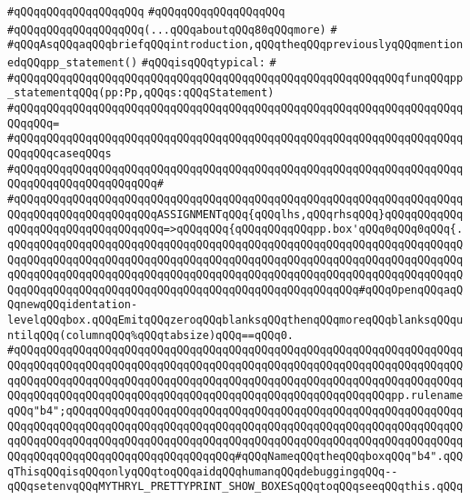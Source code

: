 \label{src/lib/prettyprint/big/src/standard-prettyprinter.api}
\verb|#qQQqqQQqqQQqqQQqqQQq|\newline
\verb|#qQQqqQQqqQQqqQQqqQQq|\newline
\verb|#qQQqqQQqqQQqqQQqqQQq(...qQQqaboutqQQq80qQQqmore)|\newline
\verb|#|\newline
\verb|#qQQqAsqQQqaqQQqbriefqQQqintroduction,qQQqtheqQQqpreviouslyqQQqmentionedqQQqpp_statement()|\newline
\verb|#qQQqisqQQqtypical:|\newline
\verb|#|\newline
\verb|#qQQqqQQqqQQqqQQqqQQqqQQqqQQqqQQqqQQqqQQqqQQqqQQqqQQqqQQqqQQqfunqQQqpp_statementqQQq(pp:Pp,qQQqs:qQQqStatement)|\newline
\verb|#qQQqqQQqqQQqqQQqqQQqqQQqqQQqqQQqqQQqqQQqqQQqqQQqqQQqqQQqqQQqqQQqqQQqqQQqqQQq=|\newline
\verb|#qQQqqQQqqQQqqQQqqQQqqQQqqQQqqQQqqQQqqQQqqQQqqQQqqQQqqQQqqQQqqQQqqQQqqQQqqQQqcaseqQQqs|\newline
\verb|#qQQqqQQqqQQqqQQqqQQqqQQqqQQqqQQqqQQqqQQqqQQqqQQqqQQqqQQqqQQqqQQqqQQqqQQqqQQqqQQqqQQqqQQqqQQq#|\newline
\verb|#qQQqqQQqqQQqqQQqqQQqqQQqqQQqqQQqqQQqqQQqqQQqqQQqqQQqqQQqqQQqqQQqqQQqqQQqqQQqqQQqqQQqqQQqqQQqASSIGNMENTqQQq{qQQqlhs,qQQqrhsqQQq}qQQqqQQqqQQqqQQqqQQqqQQqqQQqqQQqqQQq=>qQQqqQQq{qQQqqQQqqQQqpp.box'qQQq0qQQq0qQQq{.qQQqqQQqqQQqqQQqqQQqqQQqqQQqqQQqqQQqqQQqqQQqqQQqqQQqqQQqqQQqqQQqqQQqqQQqqQQqqQQqqQQqqQQqqQQqqQQqqQQqqQQqqQQqqQQqqQQqqQQqqQQqqQQqqQQqqQQqqQQqqQQqqQQqqQQqqQQqqQQqqQQqqQQqqQQqqQQqqQQqqQQqqQQqqQQqqQQqqQQqqQQqqQQqqQQqqQQqqQQqqQQqqQQqqQQqqQQqqQQqqQQqqQQqqQQqqQQqqQQqqQQq#qQQqOpenqQQqaqQQqnewqQQqidentation-levelqQQqbox.qQQqEmitqQQqzeroqQQqblanksqQQqthenqQQqmoreqQQqblanksqQQquntilqQQq(columnqQQq%qQQqtabsize)qQQq==qQQq0.|\newline
\verb|#qQQqqQQqqQQqqQQqqQQqqQQqqQQqqQQqqQQqqQQqqQQqqQQqqQQqqQQqqQQqqQQqqQQqqQQqqQQqqQQqqQQqqQQqqQQqqQQqqQQqqQQqqQQqqQQqqQQqqQQqqQQqqQQqqQQqqQQqqQQqqQQqqQQqqQQqqQQqqQQqqQQqqQQqqQQqqQQqqQQqqQQqqQQqqQQqqQQqqQQqqQQqqQQqqQQqqQQqqQQqqQQqqQQqqQQqqQQqqQQqqQQqqQQqqQQqqQQqqQQqqQQqqQQqpp.rulenameqQQq"b4";qQQqqQQqqQQqqQQqqQQqqQQqqQQqqQQqqQQqqQQqqQQqqQQqqQQqqQQqqQQqqQQqqQQqqQQqqQQqqQQqqQQqqQQqqQQqqQQqqQQqqQQqqQQqqQQqqQQqqQQqqQQqqQQqqQQqqQQqqQQqqQQqqQQqqQQqqQQqqQQqqQQqqQQqqQQqqQQqqQQqqQQqqQQqqQQqqQQqqQQqqQQqqQQqqQQqqQQqqQQqqQQqqQQqqQQqqQQq#qQQqNameqQQqtheqQQqboxqQQq"b4".qQQqThisqQQqisqQQqonlyqQQqtoqQQqaidqQQqhumanqQQqdebuggingqQQq--qQQqsetenvqQQqMYTHRYL_PRETTYPRINT_SHOW_BOXESqQQqtoqQQqseeqQQqthis.qQQq|\newline
